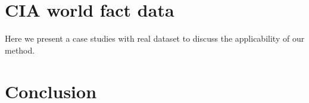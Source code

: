 \documentclass{amsart}
\begin{document}
\section{CIA world fact data}\label{sec:cia}
Here we present a case studies with real dataset to discuss the applicability of our method.

\section{Conclusion}\label{sec:conc}




\end{document}

